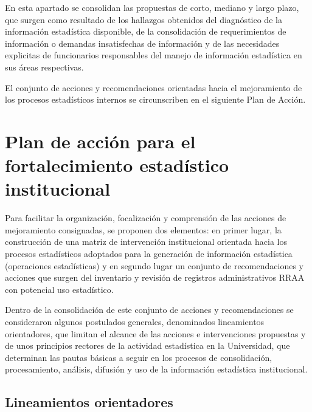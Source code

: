 \documentclass[
]{book}
\begin{document}
En esta apartado se consolidan las propuestas de corto, mediano y largo plazo, que surgen como resultado de los hallazgos obtenidos del diagnóstico de la información estadística disponible, de la consolidación de requerimientos de información o demandas insatisfechas de información y de las necesidades explicitas de funcionarios responsables del manejo de información estadística en sus áreas respectivas.

El conjunto de acciones y recomendaciones orientadas hacia el mejoramiento de los procesos estadísticos internos se circunscriben en el siguiente Plan de Acción.

\hypertarget{plan-de-acciuxf3n-para-el-fortalecimiento-estaduxedstico-institucional}{%
\section{Plan de acción para el fortalecimiento estadístico institucional}\label{plan-de-acciuxf3n-para-el-fortalecimiento-estaduxedstico-institucional}}

Para facilitar la organización, focalización y comprensión de las acciones de mejoramiento consignadas, se proponen dos elementos: en primer lugar, la construcción de una matriz de intervención institucional orientada hacia los procesos estadísticos adoptados para la generación de información estadística (operaciones estadísticas) y en segundo lugar un conjunto de recomendaciones y acciones que surgen del inventario y revisión de registros administrativos RRAA con potencial uso estadístico.

Dentro de la consolidación de este conjunto de acciones y recomendaciones se consideraron algunos postulados generales, denominados lineamientos orientadores, que limitan el alcance de las acciones e intervenciones propuestas y de unos principios rectores de la actividad estadística en la Universidad, que determinan las pautas básicas a seguir en los procesos de consolidación, procesamiento, análisis, difusión y uso de la información estadística institucional.

\hypertarget{lineamientos-orientadores}{%
\subsection{Lineamientos orientadores}\label{lineamientos-orientadores}}
\end{document}
